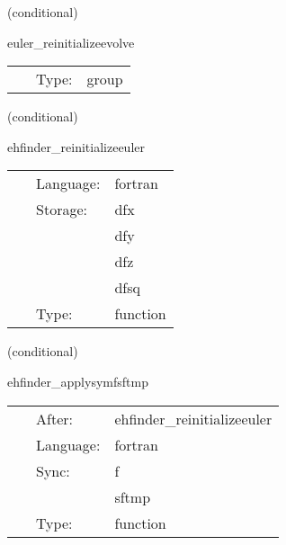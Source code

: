 \vspace{5mm}

\noindent {\bf }   (conditional) 

\hspace{5mm} euler\_reinitializeevolve 

\hspace{5mm}{\it schedule group for euler re-initialization evolution } 


\hspace{5mm}

 \begin{tabular*}{160mm}{cll} 
~ & Type:  & group \\ 
\end{tabular*} 


\vspace{5mm}

   (conditional) 

\hspace{5mm} ehfinder\_reinitializeeuler 

\hspace{5mm}{\it euler scheme } 


\hspace{5mm}

 \begin{tabular*}{160mm}{cll} 
~ & Language:  & fortran \\ 
~ & Storage:  & dfx \\ 
~& ~ &dfy\\ 
~& ~ &dfz\\ 
~& ~ &dfsq\\ 
~ & Type:  & function \\ 
\end{tabular*} 


\vspace{5mm}

   (conditional) 

\hspace{5mm} ehfinder\_applysymfsftmp 

\hspace{5mm}{\it select f for boundary conditions } 


\hspace{5mm}

 \begin{tabular*}{160mm}{cll} 
~ & After:  & ehfinder\_reinitializeeuler \\ 
~ & Language:  & fortran \\ 
~ & Sync:  & f \\ 
~& ~ &sftmp\\ 
~ & Type:  & function \\ 
\end{tabular*} 


